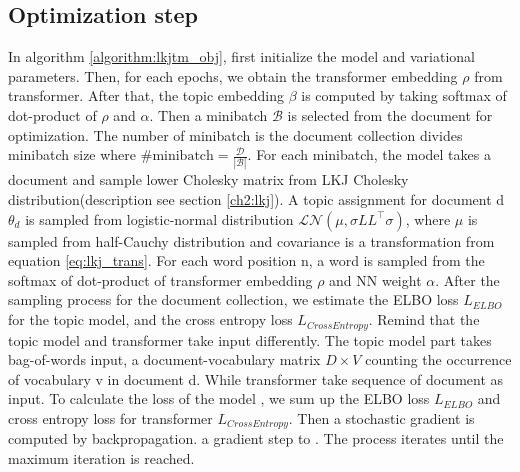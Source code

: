 \subsection{Optimization step}\label{ch4:3}
In algorithm \ref{algorithm:lkjtm_obj}, first initialize the model and variational parameters. Then, for each epochs, we obtain the transformer embedding $ \rho $ from transformer. After that, the topic embedding $ \beta $ is computed by taking softmax of dot-product of $ \rho $ and $ \alpha $. Then a minibatch $ \mathcal{B} $ is selected from the document for optimization. The number of minibatch is the document collection divides minibatch size where $ \#\text{minibatch}=\frac{\mathcal{D}}{|\mathcal{B}|} $. For each minibatch, the model takes a document and sample lower Cholesky matrix from LKJ Cholesky distribution(description see section \ref{ch2:lkj}). A topic assignment for document d $ \theta_d $ is sampled from logistic-normal distribution $ \mathcal{LN}(\mu,\sigma LL^\top\sigma) $, where $ \mu $ is sampled from half-Cauchy distribution and covariance is a transformation from equation \ref{eq:lkj_trans}. For each word position n, a word is sampled from the softmax of dot-product of transformer embedding $ \rho $ and NN weight $ \alpha $. After the sampling process for the document collection, we estimate the ELBO loss $ L_{ELBO} $ for the topic model, and the cross entropy loss $ L_{CrossEntropy} $. Remind that the topic model and transformer take input differently. The topic model part takes bag-of-words input, a document-vocabulary matrix $ D\times V $ counting the occurrence of vocabulary v in document d. While transformer take sequence of document as input. 
To calculate the loss of the model , we sum up the ELBO loss $ L_{ELBO} $ and cross entropy loss for transformer $ L_{CrossEntropy} $. Then a stochastic gradient is computed by backpropagation. a gradient step to . The process iterates until the maximum iteration is reached. 
\\
